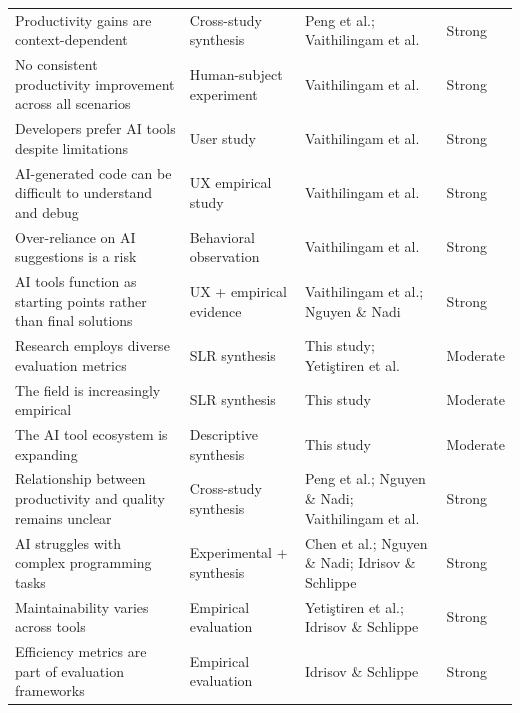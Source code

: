 \documentclass[conference]{IEEEtran}
\begin{document}
\begin{table}[t]
\begin{tabular}{p{4.8cm} p{4.5cm} p{3.5cm} p{2cm}}
Productivity gains are context-dependent & Cross-study synthesis & Peng et al.; Vaithilingam et al. & Strong \\

No consistent productivity improvement across all scenarios & Human-subject experiment & Vaithilingam et al. & Strong \\

Developers prefer AI tools despite limitations & User study & Vaithilingam et al. & Strong \\

AI-generated code can be difficult to understand and debug & UX empirical study & Vaithilingam et al. & Strong \\

Over-reliance on AI suggestions is a risk & Behavioral observation & Vaithilingam et al. & Strong \\

AI tools function as starting points rather than final solutions & UX + empirical evidence & Vaithilingam et al.; Nguyen \& Nadi & Strong \\

Research employs diverse evaluation metrics & SLR synthesis & This study; Yetiştiren et al. & Moderate \\

The field is increasingly empirical & SLR synthesis & This study & Moderate \\

The AI tool ecosystem is expanding & Descriptive synthesis & This study & Moderate \\

Relationship between productivity and quality remains unclear & Cross-study synthesis & Peng et al.; Nguyen \& Nadi; Vaithilingam et al. & Strong \\

AI struggles with complex programming tasks & Experimental + synthesis & Chen et al.; Nguyen \& Nadi; Idrisov \& Schlippe & Strong \\

Maintainability varies across tools & Empirical evaluation & Yetiştiren et al.; Idrisov \& Schlippe & Strong \\

Efficiency metrics are part of evaluation frameworks & Empirical evaluation & Idrisov \& Schlippe & Strong \\

\hline
\end{tabular}
\end{table}
\end{document}
